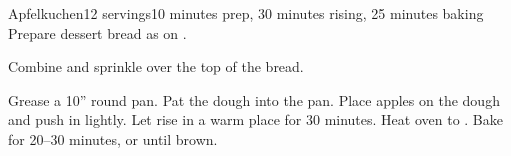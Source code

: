 \documentclass[../Cookbook.tex]{subfiles}
\begin{document}
\begin{recipe}[Apfelkuchen]{Apfelkuchen}{12 servings}{10 minutes prep, 30 minutes rising, 25 minutes baking}
	Prepare dessert bread as on .

	Combine and sprinkle over the top of the bread.

	Grease a 10'' round pan.
	Pat the dough into the pan.
	Place apples on the dough and push in lightly.
	Let rise in a warm place for 30 minutes.
	Heat oven to .
	Bake for 20--30 minutes, or until brown.
\end{recipe}
\end{document}
